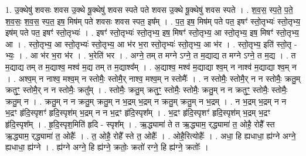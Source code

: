 \documentclass[17pt]{extarticle}
\begin{document}
1. उ॒क्थेषु॑ शवसः शवस उ॒क्थे षू॒क्थेषु॑ शवस स्पते पते शवस उ॒क्थे षू॒क्थेषु॑ शवस स्पते । . श॒व॒स॒ स्प॒ते॒ प॒ते॒ श॒व॒सः॒ श॒व॒स॒ स्प॒त॒ इष॒ मिष॑म् पते शवसः शवस स्पत॒ इष᳚म् । . प॒त॒ इष॒ मिष॑म् पते पत॒ इषꣳ॑ स्तो॒तृभ्यः॑ स्तो॒तृभ्य॒ इष॑म् पते पत॒ इषꣳ॑ स्तो॒तृभ्यः॑ । . इषꣳ॑ स्तो॒तृभ्यः॑ स्तो॒तृभ्य॒ इष॒ मिषꣳ॑ स्तो॒तृभ्य॒ आ स्तो॒तृभ्य॒ इष॒ मिषꣳ॑ स्तो॒तृभ्य॒ आ । . स्तो॒तृभ्य॒ आ स्तो॒तृभ्यः॑ स्तो॒तृभ्य॒ आ भ॑र भ॒रा स्तो॒तृभ्यः॑ स्तो॒तृभ्य॒ आ भ॑र । . स्तो॒तृभ्य॒ इति॑ स्तो॒तृ - भ्यः॒ । . आ भ॑र भ॒रा भ॑र । . भ॒रेति॑ भर । . अग्ने॒ तम् त मग्ने ऽग्ने॒ त म॒द्याद्य त मग्ने ऽग्ने॒ त म॒द्य । . त म॒द्याद्य तम् त म॒द्याश्व॒ मश्व॑ म॒द्य तम् त म॒द्याश्व᳚म् । . अ॒द्याश्व॒ मश्व॑ म॒द्याद्या श्व॒म् न नाश्व॑ म॒द्याद्या श्व॒म् न । . अश्व॒म् न नाश्व॒ मश्व॒म् न स्तोमैः॒ स्तोमै॒र् नाश्व॒ मश्व॒म् न स्तोमैः᳚ । . न स्तोमैः॒ स्तोमै॒र् न न स्तोमैः॒ क्रतु॒म् क्रतुꣳ॒॒ स्तोमै॒र् न न स्तोमैः॒ क्रतु᳚म् । . स्तोमैः॒ क्रतु॒म् क्रतुꣳ॒॒ स्तोमैः॒ स्तोमैः॒ क्रतु॒म् न न क्रतुꣳ॒॒ स्तोमैः॒ स्तोमैः॒ क्रतु॒म् न । . क्रतु॒म् न न क्रतु॒म् क्रतु॒म् न भ॒द्रम् भ॒द्रम् न क्रतु॒म् क्रतु॒म् न भ॒द्रम् । . न भ॒द्रम् भ॒द्रम् न न भ॒द्रꣳ हृ॑दि॒स्पृशꣳ॑ हृदि॒स्पृश॑म् भ॒द्रम् न न भ॒द्रꣳ हृ॑दि॒स्पृश᳚म् । . भ॒द्रꣳ हृ॑दि॒स्पृशꣳ॑ हृदि॒स्पृश॑म् भ॒द्रम् भ॒द्रꣳ हृ॑दि॒स्पृश᳚म् । . हृ॒दि॒स्पृश॒मिति॑ हृदि - स्पृश᳚म् । . ऋ॒द्ध्यामा॑ ते त ऋ॒द्ध्याम॒ र्‌द्ध्यामा॑ त॒ ओहै॒ रोहै᳚ स्त ऋ॒द्ध्याम॒ र्‌द्ध्यामा॑ त॒ ओहैः᳚ । . त॒ ओहै॒ रोहै᳚ स्ते त॒ ओहैः᳚ । . ओहै॒रित्योहैः᳚ । . अधा॒ हि ह्यधाधा॒ ह्य॑ग्ने अग्ने॒ ह्यधाधा॒ ह्य॑ग्ने । . ह्य॑ग्ने अग्ने॒ हि ह्य॑ग्ने॒ क्रतोः॒ क्रतो॑ रग्ने॒ हि ह्य॑ग्ने॒ क्रतोः᳚ । \newline
\end{document}

